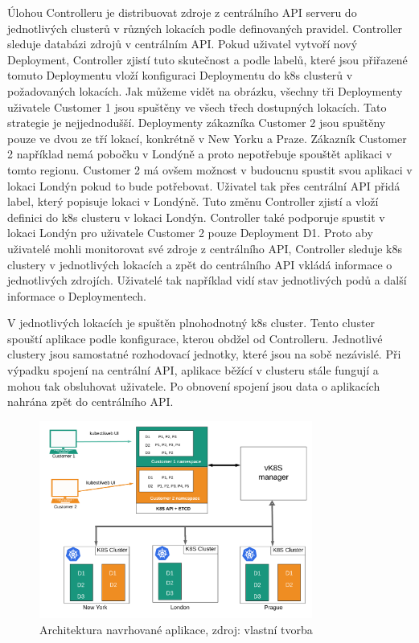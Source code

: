 Úlohou Controlleru je distribuovat zdroje z centrálního API serveru do jednotlivých clusterů v různých lokacích podle definovaných pravidel. Controller sleduje databázi zdrojů v centrálním API. Pokud uživatel vytvoří nový Deployment, Controller zjistí tuto skutečnost a podle labelů, které jsou přiřazené tomuto Deploymentu vloží konfiguraci Deploymentu do k8s clusterů v požadovaných lokacích. Jak můžeme vidět na obrázku, všechny tři Deploymenty uživatele Customer 1 jsou spuštěny ve všech třech dostupných lokacích. Tato strategie je nejjednodušší. Deploymenty zákazníka Customer 2 jsou spuštěny pouze ve dvou ze tří lokací, konkrétně v New Yorku a Praze. Zákazník Customer 2 například nemá pobočku v Londýně a proto nepotřebuje spouštět aplikaci v tomto regionu. Customer 2 má ovšem možnost v budoucnu spustit svou aplikaci v lokaci Londýn pokud to bude potřebovat. Uživatel tak přes centrální API přidá label, který popisuje lokaci v Londýně. Tuto změnu Controller zjistí a vloží definici \linebreak do k8s clusteru v lokaci Londýn. Controller také podporuje spustit v lokaci Londýn pro uživatele Customer 2 pouze Deployment D1. Proto aby uživatelé mohli monitorovat své zdroje z centrálního API, Controller sleduje k8s clustery v jednotlivých lokacích a zpět do centrálního API vkládá informace o jednotlivých zdrojích. Uživatelé tak například vidí stav jednotlivých podů a další informace o Deploymentech.\par
V jednotlivých lokacích je spuštěn plnohodnotný k8s cluster. Tento cluster spouští aplikace podle konfigurace, kterou obdžel od Controlleru. Jednotlivé clustery jsou samostatné rozhodovací jednotky, které jsou na sobě nezávislé. Při výpadku spojení na centrální API, aplikace běžící v clusteru stále fungují a mohou tak obsluhovat uživatele. Po obnovení spojení jsou data o aplikacích nahrána zpět do centrálního API. 

\begin{figure}[H]
  \begin{centering}
    
	  \includegraphics[width=0.8\textwidth]{images/vk8s-architektura.png}
    \par
	  \caption{Architektura navrhované aplikace\label{fig:vk8s-architecture}, zdroj: vlastní tvorba}
    \end{centering}
\end{figure}
